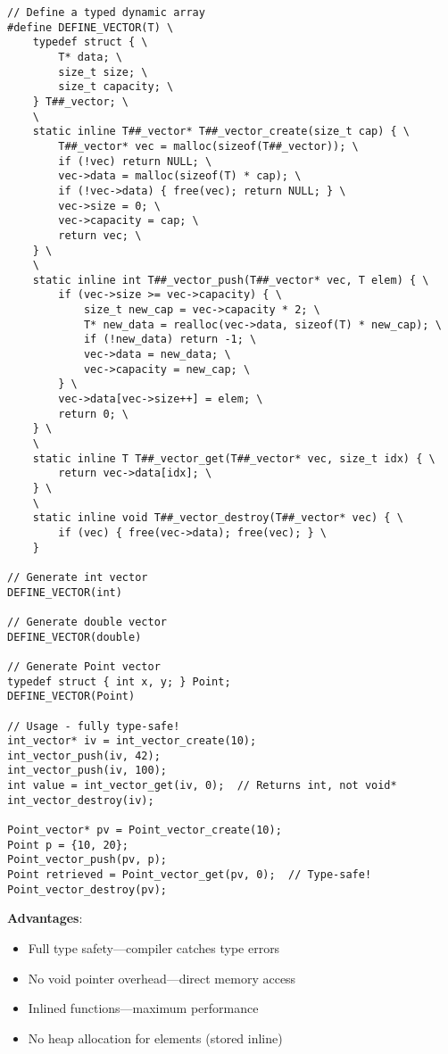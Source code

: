 \begin{lstlisting}
// Define a typed dynamic array
#define DEFINE_VECTOR(T) \
    typedef struct { \
        T* data; \
        size_t size; \
        size_t capacity; \
    } T##_vector; \
    \
    static inline T##_vector* T##_vector_create(size_t cap) { \
        T##_vector* vec = malloc(sizeof(T##_vector)); \
        if (!vec) return NULL; \
        vec->data = malloc(sizeof(T) * cap); \
        if (!vec->data) { free(vec); return NULL; } \
        vec->size = 0; \
        vec->capacity = cap; \
        return vec; \
    } \
    \
    static inline int T##_vector_push(T##_vector* vec, T elem) { \
        if (vec->size >= vec->capacity) { \
            size_t new_cap = vec->capacity * 2; \
            T* new_data = realloc(vec->data, sizeof(T) * new_cap); \
            if (!new_data) return -1; \
            vec->data = new_data; \
            vec->capacity = new_cap; \
        } \
        vec->data[vec->size++] = elem; \
        return 0; \
    } \
    \
    static inline T T##_vector_get(T##_vector* vec, size_t idx) { \
        return vec->data[idx]; \
    } \
    \
    static inline void T##_vector_destroy(T##_vector* vec) { \
        if (vec) { free(vec->data); free(vec); } \
    }

// Generate int vector
DEFINE_VECTOR(int)

// Generate double vector
DEFINE_VECTOR(double)

// Generate Point vector
typedef struct { int x, y; } Point;
DEFINE_VECTOR(Point)

// Usage - fully type-safe!
int_vector* iv = int_vector_create(10);
int_vector_push(iv, 42);
int_vector_push(iv, 100);
int value = int_vector_get(iv, 0);  // Returns int, not void*
int_vector_destroy(iv);

Point_vector* pv = Point_vector_create(10);
Point p = {10, 20};
Point_vector_push(pv, p);
Point retrieved = Point_vector_get(pv, 0);  // Type-safe!
Point_vector_destroy(pv);
\end{lstlisting}

\textbf{Advantages}:
\begin{itemize}
    \item Full type safety—compiler catches type errors
    \item No void pointer overhead—direct memory access
    \item Inlined functions—maximum performance
    \item No heap allocation for elements (stored inline)
\end{itemize}

